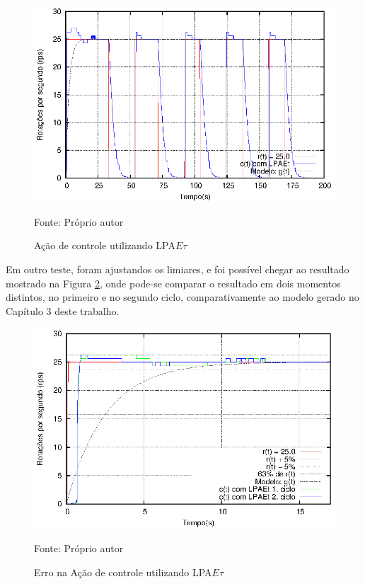 \begin{figure}[!htb]%
\caption{Ação de controle utilizando LPA$E\tau$}
\vspace{-1cm}\center\includegraphics[scale=1.6]{./imagens/LPAEt-delta.eps}
\label{fig:acaoLPAEtDelta}

{\small Fonte: Próprio autor}
\end{figure}

Em outro teste, foram ajustandos os limiares,
e foi possível chegar ao resultado mostrado na Figura \ref{fig:LPAEterro}, 
onde pode-se comparar o resultado em dois momentos distintos,
no primeiro e no segundo ciclo,
comparativamente ao modelo gerado no Capítulo 3 deste trabalho.


\begin{figure}[!htb]%
\caption{Erro na Ação de controle utilizando LPA$E\tau$}
\vspace{-1cm}\center\includegraphics[scale=1.5]{./imagens/LPAEt-erro.eps}
\label{fig:LPAEterro}

{\small Fonte: Próprio autor}
\end{figure}

